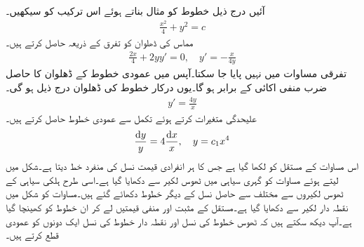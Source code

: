  آئیں درج ذیل خطوط کو مثال بناتے ہوئے اس ترکیب کو سیکھیں۔
\begin{align}\label{مساوات_سادہ_اول_کنبہ_خطوط_الف}
\frac{x^2}{4}+y^2=c
\end{align}
مماس کی ڈھلوان  کو تفرق کے ذریعہ حاصل کرتے ہیں۔
\begin{align}
\frac{2x}{4}+2y y'=0,\quad y'=-\frac{x}{4y}
\end{align}
 تفرقی مساوات میں  نہیں پایا جا سکتا۔آپس میں عمودی خطوط کے ڈھلوان کا حاصل ضرب منفی اکائی  کے برابر ہو گا۔یوں درکار خطوط کی ڈھلوان درج ذیل ہو گی۔
\begin{align}
y'=\frac{4y}{x}
\end{align}
علیحدگی متغیرات کرتے ہوئے تکمل سے عمودی خطوط حاصل کرتے ہیں۔
\begin{align}\label{مساوات_سادہ_اول_کنبہ_خطوط_ت}
\frac{\dif y}{y}=4\frac{\dif x}{x},\quad y=c_1 x^4
\end{align}
اس مساوات کے مستقل کو  لکھا گیا ہے  جس کا ہر انفرادی قیمت نسل کی منفرد خط دیتا ہے۔شکل  میں  لیتے ہوئے مساوات  کو گہری سیاہی میں ٹھوس لکیر سے دکھایا گیا ہے۔اسی طرح ہلکی سیاہی  کے ٹھوس لکیروں سے  مختلف  سے حاصل نسل کے دیگر خطوط دکھائے گئے ہیں۔مساوات  کو شکل میں نقطہ دار لکیر سے دکھایا گیا ہے۔مستقل  کے مثبت اور منفی قیمتیں لے کر ان خطوط کو کھینچا گیا ہے۔آپ دیکھ سکتے ہیں کہ ٹھوس خطوط کی نسل اور نقطہ دار خطوط کی نسل ایک دونوں کو عمودی قطع کرتے ہیں۔ 
